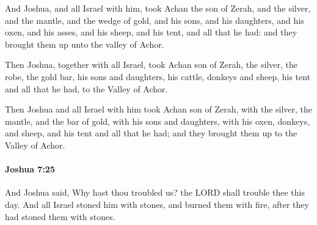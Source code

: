 			\begin{versebox}
					\item[BHS] 
					\item[ASV] And Joshua, and all Israel with him, took Achan the son of Zerah, and the silver, and the mantle, and the wedge of gold, and his sons, and his daughters, and his oxen, and his asses, and his sheep, and his tent, and all that he had: and they brought them up unto the valley of Achor.
					\item[NIV] Then Joshua, together with all Israel, took Achan son of Zerah, the silver, the robe, the gold bar, his sons and daughters, his cattle, donkeys and sheep, his tent and all that he had, to the Valley of Achor.
					\item[NRSV] Then Joshua and all Israel with him took Achan son of Zerah, with the silver, the mantle, and the bar of gold, with his sons and daughters, with his oxen, donkeys, and sheep, and his tent and all that he had; and they brought them up to the Valley of Achor.
			\end{versebox}

		\paragraph{Joshua 7:25} %
			\label{JOSHUA-7-25}

			And Joshua said, Why hast thou troubled us? the LORD shall trouble thee this day. And all Israel stoned him with stones, and burned them with fire, after they had stoned them with stones.

